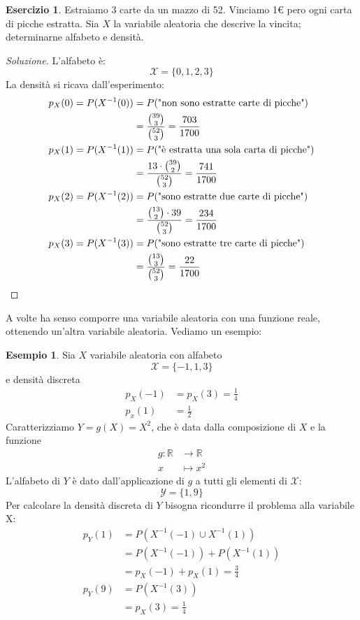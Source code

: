 \documentclass{article}
\theoremstyle{plain}
\theoremstyle{definition}
\newtheorem{esercizio}{Esercizio}[section]
\newtheorem{esempio}{Esempio}[section]
\theoremstyle{remark}
\newenvironment{soluzione}
	{\renewcommand\qedsymbol{$\mathwitch*$}\begin{proof}[Soluzione]}
	{\end{proof}}
\renewcommand{\qedsymbol}{$\mathrightghost$}
\begin{document}
\begin{esercizio}
	Estraiamo 3 carte da un mazzo di 52. Vinciamo 1€ pero ogni carta di picche estratta. Sia $X$ la variabile aleatoria che descrive la vincita; determinarne alfabeto e densità.
	\begin{soluzione}
		L'alfabeto è:
		\begin{equation*}
			\mathcal{X}=\{0,1,2,3\}
		\end{equation*}
		La densità si ricava dall'esperimento:
		\begin{align*}
			p_X(0)=P(X^{-1}(0))&=P(\text{"non sono estratte carte di picche"})\\
			&=\frac{\binom{39}{3}}{\binom{52}{3}}=\frac{703}{1700}\\
			p_X(1)=P(X^{-1}(1))&=P(\text{"è estratta una sola carta di picche"})\\
			&=\frac{13\cdot\binom{39}{2}}{\binom{52}{3}}=\frac{741}{1700}\\
			p_X(2)=P(X^{-1}(2))&=P(\text{"sono estratte due carte di picche"})\\
			&=\frac{\binom{13}{2}\cdot39}{\binom{52}{3}}=\frac{234}{1700}\\
			p_X(3)=P(X^{-1}(3))&=P(\text{"sono estratte tre carte di picche"})\\
			&=\frac{\binom{13}{3}}{\binom{52}{3}}=\frac{22}{1700}\qedhere
		\end{align*}
	\end{soluzione}
\end{esercizio}
A volte ha senso comporre una variabile aleatoria con una funzione reale, ottenendo un'altra variabile aleatoria. Vediamo un esempio:
\begin{esempio}
	Sia $X$ variabile aleatoria con alfabeto
	\begin{equation*}
		\mathcal{X}=\{-1,1,3\}
	\end{equation*}
	e densità discreta
	\begin{align*}
		p_X(-1)&=p_X(3)=\frac{1}{4}\\
		p_x(1)&=\frac{1}{2}
	\end{align*}
	Caratterizziamo $Y=g(X)=X^2$, che è data dalla composizione di $X$ e la funzione
	\begin{align*}
		g:\mathds{R}&\to\mathds{R}\\
		x&\mapsto x^2
	\end{align*}
	L'alfabeto di $Y$ è dato dall'applicazione di $g$ a tutti gli elementi di $\mathcal{X}$:
	\begin{equation*}
		\mathcal{Y}=\{1,9\}
	\end{equation*}
	Per calcolare la densità discreta di $Y$ bisogna ricondurre il problema alla variabile X:
	\begin{align*}
		p_Y(1)&=P(X^{-1}(-1)\cup X^{-1}(1))\\
		&=P(X^{-1}(-1))+P(X^{-1}(1))\\
		&=p_X(-1)+p_X(1)=\frac{3}{4}\\
		p_Y(9)&=P(X^{-1}(3))\\
		&=p_X(3)=\frac{1}{4}
	\end{align*}
\end{esempio}
\end{document}
